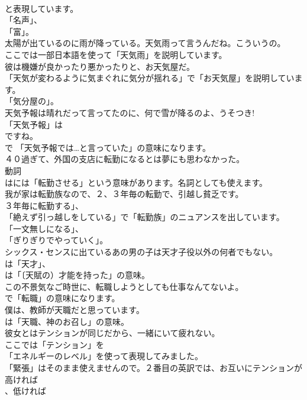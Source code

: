 \documentclass[8pt]{extreport}
\begin{document}
\begin{CJK}{UTF8}{min}
\\	と表現しています。
\\	「名声」、
\\	「富」。	
\\	太陽が出ているのに雨が降っている。天気雨って言うんだね。こういうの。 
\\	ここでは一部日本語を使って「天気雨」を説明しています。	
\\	彼は機嫌が良かったり悪かったりと、お天気屋だ。 
\\	「天気が変わるように気まぐれに気分が揺れる」で「お天気屋」を説明しています。
\\	「気分屋の」。	
\\	天気予報は晴れだって言ってたのに、何で雪が降るのよ、うそつき! 
\\	「天気予報」は
\\	ですね。
\\	で 「天気予報では…と言っていた」の意味になります。	
\\	４０過ぎて、外国の支店に転勤になるとは夢にも思わなかった。 
\\	動詞
\\	はには「転勤させる」という意味があります。名詞としても使えます。	
\\	我が家は転勤族なので、２、３年毎の転勤で、引越し貧乏です。 
\\	３年毎に転勤する」、
\\	「絶えず引っ越しをしている」で「転勤族」のニュアンスを出しています。
\\	「一文無しになる」、
\\	「ぎりぎりでやっていく」。	
\\	シックス・センスに出ているあの男の子は天才子役以外の何者でもない。 
\\	は「天才」、
\\	は「〔天賦の）才能を持った」の意味。	
\\	この不景気なご時世に、転職しようとしても仕事なんてないよ。 
\\	で「転職」の意味になります。	
\\	僕は、教師が天職だと思っています。 
\\	は「天職、神のお召し」の意味。	
\\	彼女とはテンションが同じだから、一緒にいて疲れない。 
\\	ここでは「テンション」を
\\	「エネルギーのレベル」を使って表現してみました。
\\	「緊張」はそのまま使えませんので。２番目の英訳では、お互いにテンションが高ければ
\\	、低ければ

\end{CJK}
\end{document}
